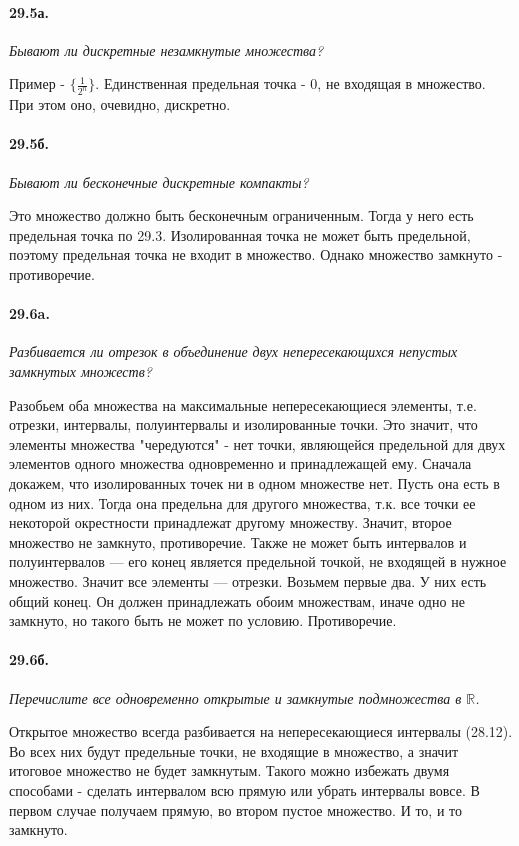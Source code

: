 \documentclass{book}
\begin{document}
\paragraph{29.5а.}
\textit{Бывают ли дискретные незамкнутые множества?}

Пример - $\{\frac{1}{2^n}\}$. Единственная предельная точка - 0, не входящая в множество. При этом оно, очевидно, дискретно.

\paragraph{29.5б.}
\textit{Бывают ли бесконечные дискретные компакты?}

Это множество должно быть бесконечным ограниченным. Тогда у него есть предельная точка по 29.3. Изолированная точка не может быть предельной, поэтому предельная точка не входит в множество. Однако множество замкнуто - противоречие.

\paragraph{29.6a.}
\textit{Разбивается ли отрезок в объединение двух непересекающихся непустых замкнутых множеств?}

Разобьем оба множества на максимальные непересекающиеся элементы, т.е. отрезки, интервалы, полуинтервалы и изолированные точки. Это значит, что элементы множества "чередуются" - нет точки, являющейся предельной для двух элементов одного множества одновременно и принадлежащей ему.
Сначала докажем, что изолированных точек ни в одном множестве нет. Пусть она есть в одном из них. Тогда она предельна для другого множества, т.к. все точки ее некоторой окрестности принадлежат другому множеству. Значит, второе множество не замкнуто, противоречие. Также не может быть интервалов и полуинтервалов --- его конец является предельной точкой, не входящей в нужное множество. Значит все элементы --- отрезки. Возьмем первые два. У них есть общий конец. Он должен принадлежать обоим множествам, иначе одно не замкнуто, но такого быть не может по условию. Противоречие.

\paragraph{29.6б.}
\textit{Перечислите все одновременно открытые и замкнутые подмножества в $\mathbb{R}$.}

Открытое множество всегда разбивается на непересекающиеся интервалы (28.12). Во всех них будут предельные точки, не входящие в множество, а значит итоговое множество не будет замкнутым. Такого можно избежать двумя способами - сделать интервалом всю прямую или убрать интервалы вовсе. В первом случае получаем прямую, во втором пустое множество. И то, и то замкнуто. 
\end{document}
